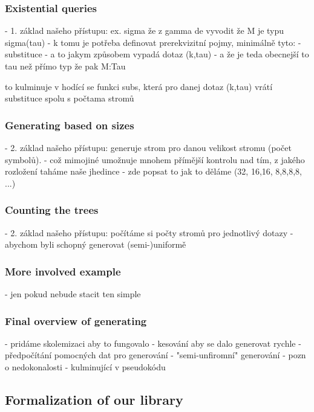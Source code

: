 \documentclass[a4paper,oneside]{memoir}
\begin{document}
\subsubsection{Existential queries}

- 1. základ našeho přístupu: ex. sigma že z gamma de vyvodit že M je typu sigma(tau)
  - k tomu je potřeba definovat prerekvizitní pojmy, minimálně tyto:
    - substituce
    - a to jakym způsobem vypadá dotaz (k,tau) - a že je teda obecnejší to tau než přímo typ že pak M:Tau

to kulminuje v hodící se funkci subs, která pro danej dotaz (k,tau) vrátí substituce spolu s počtama stromů


\subsubsection{Generating based on sizes}

- 2. základ našeho přístupu: generuje strom pro danou velikost stromu (počet symbolů).
  - což mimojiné umožnuje mnohem přímější kontrolu nad tím, z jakého rozložení taháme naše jhedince 
  - zde popsat to jak to děláme (32, 16,16, 8,8,8,8, ...)

\subsubsection{Counting the trees}

- 2. základ našeho přístupu: počítáme si počty stromů pro jednotlivý dotazy 
     - abychom byli schopný generovat (semi-)uniformě

\subsubsection{More involved example}

- jen pokud nebude stacit ten simple

\subsubsection{Final overview of generating}

- pridáme skolemizaci aby to fungovalo
- kesování aby se dalo generovat rychle
    - předpočítání pomocných dat pro generování
    - "semi-unfiromní" generování - pozn o nedokonalosti 
- kulminující v pseudokódu

\subsection{Formalization of our library}
\end{document}
